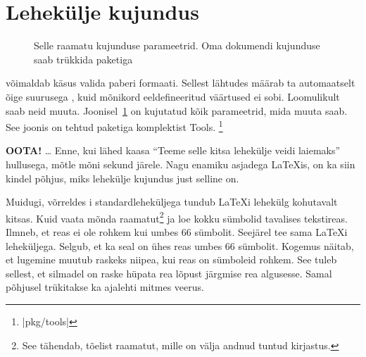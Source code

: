 \section{Lehekülje kujundus}

\begin{figure}[!hp]
\begin{center}
\makeatletter\lay@layout\makeatother%
{}
\end{center}
\vspace*{1.8cm}
\caption[Selle raamatu kujunduse parameetrid]{Selle raamatu kujunduse
parameetrid. Oma dokumendi kujunduse saab trükkida paketiga
}
\label{fig:layout}
\end{figure}

\LaTeXe{} võimaldab käsus  valida paberi formaati. Sellest lähtudes määrab ta automaatselt õige
suurusega , kuid mõnikord eeldefineeritud väärtused ei sobi.
Loomulikult saab neid muuta.
\thispagestyle{fancyplain}%
Joonisel~\ref{fig:layout} on kujutatud kõik parameetrid, mida muuta saab.
See joonis on tehtud paketiga  komplektist Tools.%
\footnote{\CTAN|pkg/tools|}

\textbf{OOTA!} \ldots{} Enne, kui lähed kaasa "`Teeme selle kitsa
lehekülje veidi laiemaks"' hullusega, mõtle mõni sekund järele. Nagu
enamiku asjadega \LaTeX is, on ka siin kindel põhjus, miks lehekülje
kujundus just selline on.

Muidugi, võrreldes i standardleheküljega tundub \LaTeX i
lehekülg kohutavalt kitsas. Kuid vaata mõnda raamatut\footnote{See
tähendab, tõelist raamatut, mille on välja andnud tuntud kirjastus.} ja
loe kokku sümbolid tavalises tekstireas. Ilmneb, et reas ei ole rohkem
kui umbes 66 sümbolit. Seejärel tee sama \LaTeX i leheküljega. Selgub,
et ka seal on ühes reas umbes 66 sümbolit. Kogemus näitab, et
lugemine muutub raskeks niipea, kui reas on sümboleid rohkem. See tuleb
sellest, et silmadel on raske hüpata rea lõpust järgmise rea
algusesse. Samal põhjusel trükitakse ka ajalehti mitmes veerus.

